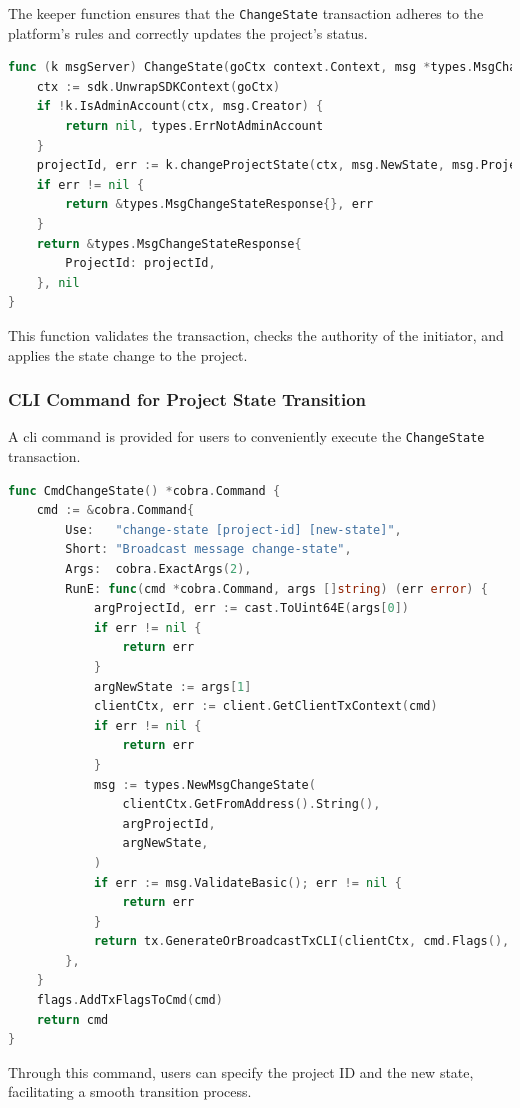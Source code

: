 The keeper function ensures that the \texttt{ChangeState} transaction adheres to the platform's rules and correctly updates the project's status.

\begin{lstlisting}[language=go, caption=Keeper implementation for ChangeState, label={lst:keeper_change_state}]
func (k msgServer) ChangeState(goCtx context.Context, msg *types.MsgChangeState) (*types.MsgChangeStateResponse, error) {
	ctx := sdk.UnwrapSDKContext(goCtx)
	if !k.IsAdminAccount(ctx, msg.Creator) {
		return nil, types.ErrNotAdminAccount
	}
	projectId, err := k.changeProjectState(ctx, msg.NewState, msg.ProjectId)
	if err != nil {
		return &types.MsgChangeStateResponse{}, err
	}
	return &types.MsgChangeStateResponse{
		ProjectId: projectId,
	}, nil
}
\end{lstlisting}

This function validates the transaction, checks the authority of the initiator, and applies the state change to the project.

\subsubsection{CLI Command for Project State Transition}
\label{subsubsec:cli-project-state-transition}

A \gls{cli} command is provided for users to conveniently execute the \texttt{ChangeState} transaction.

\begin{lstlisting}[language=go, caption=Change State CLI Definition, label={lst:change-state-cli}]
func CmdChangeState() *cobra.Command {
	cmd := &cobra.Command{
		Use:   "change-state [project-id] [new-state]",
		Short: "Broadcast message change-state",
		Args:  cobra.ExactArgs(2),
		RunE: func(cmd *cobra.Command, args []string) (err error) {
			argProjectId, err := cast.ToUint64E(args[0])
			if err != nil {
				return err
			}
			argNewState := args[1]
			clientCtx, err := client.GetClientTxContext(cmd)
			if err != nil {
				return err
			}
			msg := types.NewMsgChangeState(
				clientCtx.GetFromAddress().String(),
				argProjectId,
				argNewState,
			)
			if err := msg.ValidateBasic(); err != nil {
				return err
			}
			return tx.GenerateOrBroadcastTxCLI(clientCtx, cmd.Flags(), msg)
		},
	}
	flags.AddTxFlagsToCmd(cmd)
	return cmd
}
\end{lstlisting}

Through this command, users can specify the project ID and the new state, facilitating a smooth transition process.

